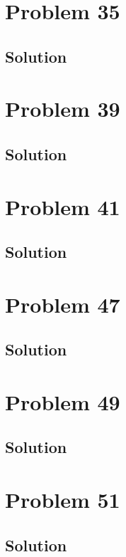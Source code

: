 \documentclass[12pt]{article}
\begin{document}
    \section{Problem 35}

        \subsection{Solution}

    \pagebreak
    \section{Problem 39}

        \subsection{Solution}

    \pagebreak
    \section{Problem 41}

        \subsection{Solution}

    \pagebreak
    \section{Problem 47}

        \subsection{Solution}

    \pagebreak
    \section{Problem 49}

        \subsection{Solution}

    \pagebreak
    \section{Problem 51}

        \subsection{Solution}
\end{document}
